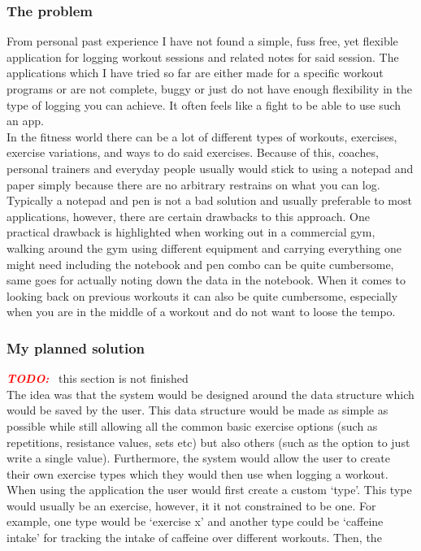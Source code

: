 \documentclass{article}
\newcommand{\vspaceconst}{-2ex}
\newcommand{\TODO}{\textbf{\textit{\textcolor{red}{TODO:}}} }
\begin{document}
\begin{multicols}{2}
\subsubsection{The problem}
\vspace{\vspaceconst}

From personal past experience I have not found a simple, fuss free, yet flexible application for logging workout sessions and related notes for said session. The applications which I have tried so far are either made for a specific workout programs or are not complete, buggy or just do not have enough flexibility in the type of logging you can achieve. It often feels like a fight to be able to use such an app.\\
In the fitness world there can be a lot of different types of workouts, exercises, exercise variations, and ways to do said exercises. Because of this, coaches, personal trainers and everyday people usually would stick to using a notepad and paper  simply because there are no arbitrary restrains on what you can log.\\
Typically a notepad and pen is not a bad solution and usually preferable to most applications, however, there are certain drawbacks to this approach. One practical drawback is highlighted when working out in a commercial gym, walking around the gym using different equipment and carrying everything one might need including the notebook and pen combo can be quite cumbersome, same goes for actually noting down the data in the notebook. When it comes to looking back on previous workouts it can also be quite cumbersome, especially when you are in the middle of a workout and do not want to loose the tempo.\\

\subsubsection{My planned solution}
\vspace{\vspaceconst}
\TODO~this section is not finished\\

The idea was that the system would be designed around the data structure which would be saved by the user. This data structure would be made as simple as possible while still allowing all the common basic exercise options (such as repetitions, resistance values, sets etc) but also others (such as the option to just write a single value). Furthermore, the system would allow the user to create their own exercise types which they would then use when logging a workout.\\
When using the application the user would first create a custom `type'. This type would usually be an exercise, however, it it not constrained to be one. For example, one type would be `exercise x' and another type could be `caffeine intake' for tracking the intake of caffeine over different workouts. Then, the \\


\end{multicols}
\end{document}

